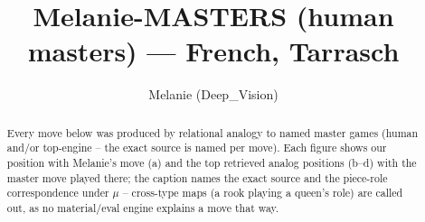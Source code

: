 \documentclass[11pt]{article}
\title{Melanie-MASTERS (human masters) — French, Tarrasch}
\author{Melanie (Deep\_Vision)}
\date{}
\begin{document}
\maketitle

\begin{abstract}Every move below was produced by relational analogy to named master games (human and/or top-engine -- the exact source is named per move). Each figure shows our position with Melanie's move (a) and the top retrieved analog positions (b--d) with the master move played there; the caption names the exact source and the piece-role correspondence under $\mu$ -- cross-type maps (a rook playing a queen's role) are called out, as no material/eval engine explains a move that way.\end{abstract}

\begin{figure}[p]\centering
\begin{subfigure}{0.46\textwidth}\centering
\resizebox{\linewidth}{!}{%
\newchessgame
\chessboard[
  setfen={r1bqkb1r/pp1n1ppB/2n1p3/2ppP3/3P4/2P5/PP1N1PPP/R1BQK1NR b KQkq - 0 7},
  showmover=false,
  pgfstyle=straightmove, color=movearrow, markmove={h8-h7}
]}
\caption{}
\end{subfigure}\hfill
\begin{subfigure}{0.46\textwidth}\centering
\resizebox{\linewidth}{!}{%
\newchessgame
\chessboard[
  setfen={r1bq1rk1/pp5p/2n1pn2/2b3p1/2PpPp1P/P2B4/1P1N1PPB/R2QK1NR b KQ - 1 13},
  showmover=false,
  pgfstyle=straightmove, color=movearrow, markmove={h7-h6}
]}
\caption{}
\end{subfigure}
\\[4pt]
\begin{subfigure}{0.46\textwidth}\centering
\resizebox{\linewidth}{!}{%
\newchessgame
\chessboard[
  setfen={r2qkb1r/1p1n1ppp/2n1p3/2ppPb2/B2P4/2P5/PP1N1PPP/R1BQNRK1 b kq - 0 11},
  showmover=false,
  pgfstyle=straightmove, color=movearrow, markmove={c5-d4}
]}
\caption{}
\end{subfigure}\hfill
\begin{subfigure}{0.46\textwidth}\centering
\resizebox{\linewidth}{!}{%
\newchessgame
\chessboard[
  setfen={rnbqkb1r/pp6/2p4p/6p1/2Ppp1n1/P2P1N1P/1P2B1P1/R1BQK1NR w KQkq - 0 12},
  showmover=false,
  pgfstyle=straightmove, color=movearrow, markmove={h3-g4}
]}
\caption{}
\end{subfigure}

\end{figure}
\end{document}
